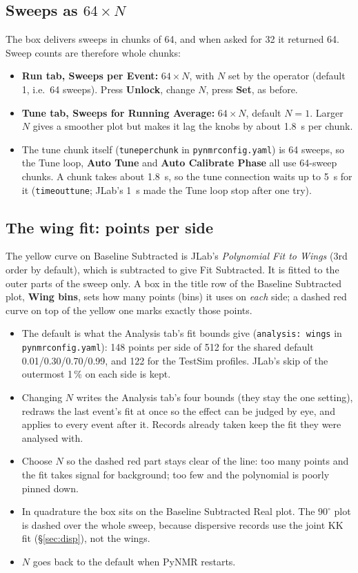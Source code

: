 \documentclass[11pt]{article}
\newcommand{\code}[1]{\texttt{\begingroup\def\_{\textunderscore\allowbreak}#1\endgroup}}
\newcommand{\btn}[1]{\textsf{\textbf{#1}}}   %
\begin{document}
\subsection{Sweeps as $64\times N$}
\label{sec:sweeps}
The box delivers sweeps in chunks of 64, and when asked for 32 it returned 64. Sweep counts are therefore whole
chunks:
\begin{itemize}
\item \textbf{Run tab, Sweeps per Event:} $64\times N$, with $N$ set by the operator (default 1, i.e.\ 64
  sweeps). Press \btn{Unlock}, change $N$, press \btn{Set}, as before.
\item \textbf{Tune tab, Sweeps for Running Average:} $64\times N$, default $N=1$. Larger $N$ gives a smoother
  plot but makes it lag the knobs by about 1.8~s per chunk.
\item The tune chunk itself (\code{tune\_per\_chunk} in \code{pynmr\_config.yaml}) is 64 sweeps, so the Tune loop,
  \btn{Auto Tune} and \btn{Auto Calibrate Phase} all use 64-sweep chunks. A chunk takes about 1.8~s, so the
  tune connection waits up to 5~s for it (\code{timeout\_tune}; JLab's 1~s made the Tune loop stop after one try).
\end{itemize}

\subsection{The wing fit: points per side}
\label{sec:wings}
The yellow curve on Baseline Subtracted is JLab's \emph{Polynomial Fit to Wings} (3rd order by default),
which is subtracted to give Fit Subtracted. It is fitted to the outer parts of the sweep only. A box in the
title row of the Baseline Subtracted plot, \btn{Wing bins}, sets how many points (bins) it uses on \emph{each} side;
a dashed red curve on top of the yellow one marks exactly those points.
\begin{itemize}
\item The default is what the Analysis tab's fit bounds give (\code{analysis: wings} in \code{pynmr\_config.yaml}):
  148 points per side of 512 for the shared default 0.01/0.30/0.70/0.99, and 122 for the TestSim profiles.
  JLab's skip of the outermost 1\,\% on each side is kept.
\item Changing $N$ writes the Analysis tab's four bounds (they stay the one setting), redraws the last event's fit
  at once so the effect can be judged by eye, and applies to every event after it. Records already taken keep the
  fit they were analysed with.
\item Choose $N$ so the dashed red part stays clear of the line: too many points and the fit takes signal for
  background; too few and the polynomial is poorly pinned down.
\item In quadrature the box sits on the Baseline Subtracted Real plot. The $90^\circ$ plot is dashed over the whole
  sweep, because dispersive records use the joint KK fit (\S\ref{sec:disp}), not the wings.
\item $N$ goes back to the default when PyNMR restarts.
\end{itemize}
\end{document}
